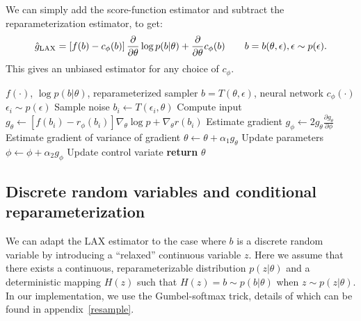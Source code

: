 \documentclass{article}
\newcommand{\E}{\mathbb{E}}
\newcommand{\PT}{\frac{\partial}{\partial \theta}}
\newcommand{\LP}[1]{\PT \log p(#1)}
\newcommand{\LAX}{{\textnormal{LAX}}}
\newcommand{\RELAX}{{\textnormal{RELAX}}}
\begin{document}
%
%
%
We can simply add the score-function estimator and subtract the reparameterization estimator, to get:
%
\begin{align}
\label{eq:cont_est}
\hat g_\LAX = \left[ f(b) -c_\phi(b) \right] \PT \log p(b|\theta) + \PT c_\phi(b) \qquad b = b(\theta, \epsilon), \epsilon \sim p(\epsilon).
\end{align}
%
This gives an unbiased estimator for any choice of $c_\phi$.


\begin{algorithm}[h]
\begin{algorithmic}
\Require $f(\cdot)$, $\log p(b|\theta)$, reparameterized sampler $b = T(\theta, \epsilon)$, neural network $c_\phi(\cdot)$
	\State $\epsilon_{i} \sim p(\epsilon)$ \Comment Sample noise
	\State $b_i \leftarrow T(\epsilon_i, \theta)$ \Comment Compute input
	\State  $g_\theta \leftarrow \left[f(b_i) - r_{\phi}(b_i) \right] \nabla_\theta \log p + \nabla_\theta r(b_i)$ \Comment Estimate gradient
	\State  $g_\phi \leftarrow 2 g_\theta \frac{\partial g_\theta}{\partial \phi}$ \Comment Estimate gradient of variance of gradient
	\State $\theta \leftarrow \theta + \alpha_1 g_\theta$ \Comment Update parameters
	\State $\phi \leftarrow \phi + \alpha_2 g_\phi$ \Comment Update control variate
\EndWhile
\State \textbf{return} $\theta$ 
\end{algorithmic}
\caption{\LAX{}: Optimizing parameters and a gradient control variate simultaneously.}
\label{lax}
\end{algorithm}

\subsection{Discrete random variables and conditional reparameterization}
We can adapt the \LAX{} estimator to the case where $b$ is a discrete random variable by introducing a ``relaxed'' continuous variable $z$. %
Here we assume that there exists a continuous, reparameterizable distribution $p(z|\theta)$ and a deterministic mapping $H(z)$ such that $H(z) = b \sim p(b|\theta)$ when $z \sim p(z|\theta)$.
In our implementation, we use the Gumbel-softmax trick, details of which can be found in appendix~\ref{resample}.
\end{document}

